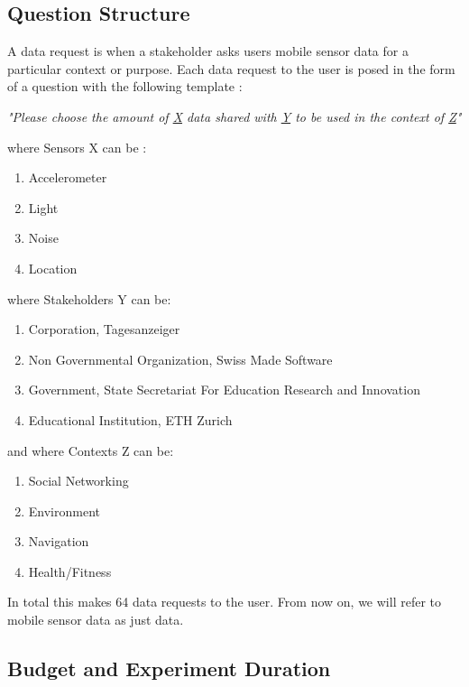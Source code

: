 \subsection{Question Structure} \label{struct}

A data request is when a stakeholder asks users mobile sensor data for a particular context or purpose. Each data request to the user is posed in the form of a question with the following template :

\textit{"Please choose the amount of \underline{X} data shared with \underline{Y} to be used in the context of \underline{Z}"}

where Sensors X can be :
\begin{enumerate}
    \item Accelerometer
    \item Light
    \item Noise
    \item Location
\end{enumerate}
where Stakeholders Y can be:
\begin{enumerate}
    \item Corporation, Tagesanzeiger 
    \item Non Governmental Organization, Swiss Made Software
    \item Government, State Secretariat For Education Research and Innovation
    \item Educational Institution, ETH Zurich
\end{enumerate}
and where Contexts Z can be:
\begin{enumerate}
	\item Social Networking
    \item Environment
    \item Navigation
    \item Health/Fitness  
\end{enumerate}

In total this makes 64 data requests to the user. From now on, we will refer to mobile sensor data as just data.

\subsection{Budget and Experiment Duration}

